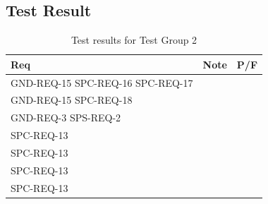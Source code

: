 \subsection{Test Result}


\begin{table}[H]
	\begin{tabular}{|p{2.7cm}|p{12.4cm}|p{1cm}|}
		\hline
		\textbf{Req} & \textbf{Note} & \textbf{P/F}\\
		\hline
		GND-REQ-15 SPC-REQ-16 SPC-REQ-17 & & \\
		\hline
		GND-REQ-15 SPC-REQ-18 &  & \\
		\hline
		GND-REQ-3 SPS-REQ-2 &  & \\
		\hline
		SPC-REQ-13 &  & \\
		\hline
		SPC-REQ-13 &  & \\
		\hline
		SPC-REQ-13 &  & \\
		\hline
		SPC-REQ-13 &  & \\
		\hline
		
	\end{tabular}
	\caption{Test results for Test Group 2}
	\label{tab:TestGroup2_testresults}
\end{table}
